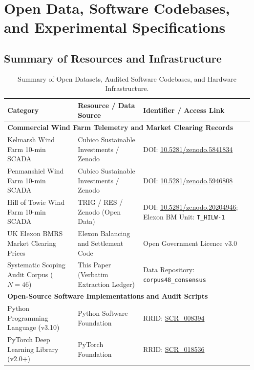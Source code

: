 \section{Open Data, Software Codebases, and Experimental Specifications}
\label{sec:data_code_spec}

\subsection{Summary of Resources and Infrastructure}

\begin{table}[!h]
\centering
\footnotesize
\renewcommand{\arraystretch}{0.88}
\setlength{\tabcolsep}{4pt}
\caption{Summary of Open Datasets, Audited Software Codebases, and Hardware Infrastructure.}
\label{tab:key_resources}
\begin{tabularx}{\textwidth}{p{4.0cm}p{5.5cm}>{\raggedright\arraybackslash}X}
\toprule
\textbf{Category} & \textbf{Resource / Data Source} & \textbf{Identifier / Access Link} \\
\midrule
\multicolumn{3}{l}{\textbf{Commercial Wind Farm Telemetry and Market Clearing Records}} \\
\midrule
Kelmarsh Wind Farm 10-min SCADA & Cubico Sustainable Investments / Zenodo & DOI: \href{https://doi.org/10.5281/zenodo.5841834}{10.5281/zenodo.5841834} \\
Penmanshiel Wind Farm 10-min SCADA & Cubico Sustainable Investments / Zenodo & DOI: \href{https://doi.org/10.5281/zenodo.5946808}{10.5281/zenodo.5946808} \\
Hill of Towie Wind Farm 10-min SCADA & TRIG / RES / Zenodo (Open Data) & DOI: \href{https://doi.org/10.5281/zenodo.20204946}{10.5281/zenodo.20204946}; Elexon BM Unit: \texttt{T\_HILW-1} \\
UK Elexon BMRS Market Clearing Prices & Elexon Balancing and Settlement Code & Open Government Licence v3.0 \\
Systematic Scoping Audit Corpus ($N=46$) & This Paper (Verbatim Extraction Ledger) & Data Repository: \texttt{corpus48\_consensus} \\
\midrule
\multicolumn{3}{l}{\textbf{Open-Source Software Implementations and Audit Scripts}} \\
\midrule
Python Programming Language (v3.10) & Python Software Foundation & RRID: \href{https://scicrunch.org/resolver/SCR_008394}{SCR\_008394} \\
PyTorch Deep Learning Library (v2.0+) & PyTorch Foundation & RRID: \href{https://scicrunch.org/resolver/SCR_018536}{SCR\_018536} \\

\end{tabularx}
\end{table}
